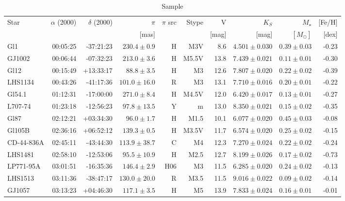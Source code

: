 \documentclass[structabstract]{aa}
\begin{document}
\onecolumn

\begin{center}
\label{full_table} 
\begin{longtable}{ l r r r r r r r r r}
\caption{Sample} \\

\hline
\hline
Star & $\alpha$ (2000) & $\delta$ (2000) & $\pi$ & $\pi$ src & Stype & V & $K_{S}$ & $M_{\star}$ & [Fe/H] \\
 &  & & [mas] & & & [mag] & [mag] & $[M_{\odot}]$ & [dex]\\
\hline
Gl1 & 00:05:25 & -37:21:23 & $230.4\pm 0.9$ & H & M3V &  8.6 & $4.501\pm0.030$ & $0.39\pm0.03$ & -0.23 \\
GJ1002 & 00:06:44 & -07:32:23 & $213.0\pm 3.6$ & H & M5.5V & 13.8 & $7.439\pm0.021$ & $0.11\pm0.01$ & -0.30 \\
Gl12 & 00:15:49 & +13:33:17 & $88.8\pm 3.5$ & H & M3 & 12.6 & $7.807\pm0.020$ & $0.22\pm0.02$ & -0.39 \\
LHS1134 & 00:43:26 & -41:17:36 & $101.0\pm16.0$ & R & M3 & 13.1 & $7.710\pm0.016$ & $0.20\pm0.01$ & -0.22 \\
Gl54.1 & 01:12:31 & -17:00:00 & $271.0\pm 8.4$ & H & M4.5V & 12.0 & $6.420\pm0.017$ & $0.13\pm0.01$ & -0.27 \\
L707-74 & 01:23:18 & -12:56:23 & $97.8\pm13.5$ & Y & m & 13.0 & $8.350\pm0.021$ & $0.15\pm0.02$ & -0.35 \\
Gl87 & 02:12:21 & +03:34:30 & $96.0\pm 1.7$ & H & M1.5 & 10.1 & $6.077\pm0.020$ & $0.45\pm0.03$ & -0.08 \\
Gl105B & 02:36:16 & +06:52:12 & $139.3\pm 0.5$ & H & M3.5V & 11.7 & $6.574\pm0.020$ & $0.25\pm0.02$ & -0.15 \\
CD-44-836A & 02:45:11 & -43:44:30 & $113.9\pm38.7$ & C & M4 & 12.3 & $7.270\pm0.024$ & $0.22\pm0.02$ & -0.24 \\
LHS1481 & 02:58:10 & -12:53:06 & $95.5\pm10.9$ & H & M2.5 & 12.7 & $8.199\pm0.026$ & $0.17\pm0.02$ & -0.73 \\
LP771-95A & 03:01:51 & -16:35:36 & $146.4\pm 2.9$ & H06 & M3 & 11.5 & $6.285\pm0.020$ & $0.24\pm0.02$ & -0.13 \\
LHS1513 & 03:11:36 & -38:47:17 & $130.0\pm20.0$ & R & M3.5 & 11.5 & $9.016\pm0.022$ & $0.09\pm0.02$ & -0.14 \\
GJ1057 & 03:13:23 & +04:46:30 & $117.1\pm 3.5$ & H & M5 & 13.9 & $7.833\pm0.024$ & $0.16\pm0.01$ & -0.01 \\

\end{longtable}
\end{center}
\end{document}
